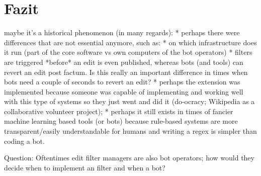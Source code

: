 \section{Fazit}

maybe it's a historical phenomenon (in many regards):
* perhaps there were differences that are not essential anymore, such as:
  * on which infrastructure does it run (part of the core software vs own computers of the bot operators)
  * filters are triggered *before* an edit is even published, whereas bots (and tools) can revert an edit post factum. Is this really an important difference in times when bots need a couple of seconds to revert an edit?
* perhaps the extension was implemented because someone was capable of implementing and working well with this type of systems so they just went and did it (do-ocracy; Wikipedia as a collaborative volunteer project);
* perhaps it still exists in times of fancier machine learning based tools (or bots) because rule-based systems are more transparent/easily understandable for humans and writing a regex is simpler than coding a bot.

Question:
Oftentimes edit filter managers are also bot operators; how would they decide when to implement an filter and when a bot?

